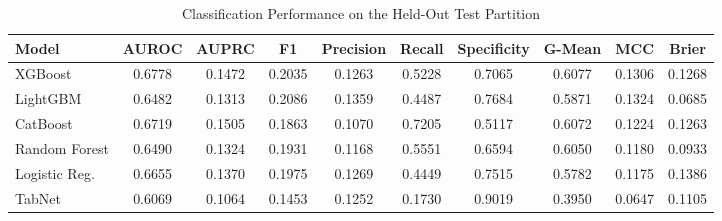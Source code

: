\begin{table}
\centering
\caption{Classification Performance on the Held-Out Test Partition}
\label{tab:results}
\begin{tabular}{lccccccccc}
\toprule
Model & AUROC & AUPRC & F1 & Precision & Recall & Specificity & G-Mean & MCC & Brier \\
\midrule
XGBoost & 0.6778 & 0.1472 & 0.2035 & 0.1263 & 0.5228 & 0.7065 & 0.6077 & 0.1306 & 0.1268 \\
LightGBM & 0.6482 & 0.1313 & 0.2086 & 0.1359 & 0.4487 & 0.7684 & 0.5871 & 0.1324 & 0.0685 \\
CatBoost & 0.6719 & 0.1505 & 0.1863 & 0.1070 & 0.7205 & 0.5117 & 0.6072 & 0.1224 & 0.1263 \\
Random Forest & 0.6490 & 0.1324 & 0.1931 & 0.1168 & 0.5551 & 0.6594 & 0.6050 & 0.1180 & 0.0933 \\
Logistic Reg. & 0.6655 & 0.1370 & 0.1975 & 0.1269 & 0.4449 & 0.7515 & 0.5782 & 0.1175 & 0.1386 \\
TabNet & 0.6069 & 0.1064 & 0.1453 & 0.1252 & 0.1730 & 0.9019 & 0.3950 & 0.0647 & 0.1105 \\
\bottomrule
\end{tabular}
\end{table}

